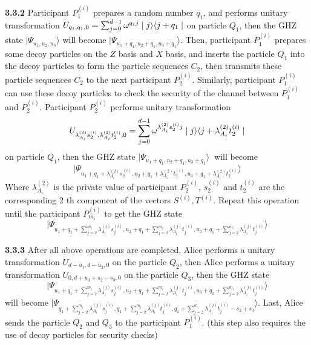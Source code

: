 \documentclass[pdflatex,sn-mathphys]{sn-jnl}%
\theoremstyle{thmstyleone}%
\theoremstyle{thmstyletwo}%
\theoremstyle{thmstylethree}%
\begin{document}
\indent\textbf{3.3.2} Participant $P_1^{(i)}$ prepares a random number $q_1$, and performs unitary transformation
$U_{{q_1},{q_1},{0}}=\sum_{j=0}^{d-1} \omega^{{q_1}j}\mid{j}\rangle\langle{j+{q_1}}\mid\notag$
on particle $Q_1$, then the GHZ state 
$\mid\varPsi_{{u_1},{u_2},{u_3}}\rangle$
will become $\mid\varPsi_{{u_1}+{q_1},{u_2}+{q_1},{u_3}+{q_1}}\rangle$. Then, participant $P_1^{(i)}$ prepares some decoy particles on the $Z$ basis and $X$ basis, and inserts the particle $Q_1$ into the decoy particles to form the particle sequences $C_2$, then transmits these particle sequences $C_2$ to the next participant $P_2^{(i)}$. Similarly, participant $P_1^{(i)}$ can use these decoy particles to check the security of the channel between $P_1^{(i)}$ and $P_2^{(i)}$. Participant $P_2^{(i)}$ performs unitary transformation
\begin{equation}
U_{{\lambda_{A_i}^{(2)}s_2^{(i)}},{\lambda_{A_i}^{(2)}t_2^{(i)}},{0}}=\sum_{j=0}^{d-1} \omega^{{\lambda_{A_i}^{(2)}s_2^{(i)}}j}\mid{j}\rangle\langle{j+{\lambda_{A_i}^{(2)}t_2^{(i)}}}\mid\notag
\end{equation}
on particle $Q_1$, then the GHZ state $\mid\varPsi_{{u_1}+{q_1},{u_2}+{q_1},{u_3}+{q_1}}\rangle\ $ will become 
\[\mid\varPsi_{{u_1}+{q_1}+{\lambda_{A_i}^{(2)}s_2^{(i)}},{u_2}+{q_1}+{\lambda_{A_i}^{(2)}t_2^{(i)}},{u_3}+{q_1+{\lambda_{A_i}^{(2)}t_2^{(i)}}}}\rangle\]  
Where $\lambda_{A_i}^{(2)}$ is the private value of participant $P_2^{(i)}$, $s_2^{(i)}$ and $t_2^{(i)}$ are the corresponding 2 th component of the vectors $S^{(i)},T^{(i)}$. Repeat this operation until the participant $P_{m_i}^{(i)}$ to get the GHZ state
\[\mid\varPsi_{{u_1}+{q_1}+\sum_{j=2}^{m_i}{\lambda_{A_i}^{(j)}s_j^{(i)}},{u_2}+{q_1}+\sum_{j=2}^{m_i}{\lambda_{A_i}^{(j)}t_j^{(i)}},{u_3}+{q_1}+\sum_{j=2}^{m_i}{\lambda_{A_i}^{(j)}t_j^{(i)}}}\rangle\]  

\indent\textbf{3.3.3} After all above operations are completed, Alice performs a unitary transformation $U_{{d-u_1},{d-u_2},{0}}$ on the particle $Q_2$, then Alice performs a unitary transformation $U_{{0},{d+u_3+s_2-s_3},{0}}$ on the particle $Q_3$, then the GHZ state 
\[\mid\varPsi_{{u_1}+{q_1}+\sum_{j=2}^{m_i}{\lambda_{A_i}^{(j)}s_j^{(i)}},{u_2}+{q_1}+\sum_{j=2}^{m_i}{\lambda_{A_i}^{(j)}t_j^{(i)}},{u_3}+{q_1}+\sum_{j=2}^{m_i}{\lambda_{A_i}^{(j)}t_j^{(i)}}}\rangle\] 
will become
$\mid\varPsi_{{q_1}+\sum_{j=2}^{m_i}{\lambda_{A_i}^{(j)}s_j^{(i)}},{q_1}+\sum_{j=2}^{m_i}{\lambda_{A_i}^{(j)}t_j^{(i)}},{q_1}+\sum_{j=2}^{m_i}{\lambda_{A_i}^{(j)}t_j^{(i)}-s_2+s_3}}\rangle $. Last, Alice sends the particle $Q_2$ and $Q_3$ to the participant $P_1^{(i)}$. (this step also requires the use of decoy particles for security checks)
\end{document}
